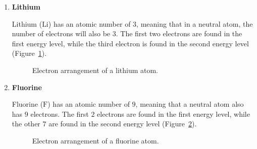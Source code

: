 \begin{enumerate}[noitemsep, label=\textbf{\arabic*}. ] 

\item{\textbf{Lithium} \\
\begin{minipage}{.4\textwidth}
Lithium ($\text{Li}$) has an atomic number of $3$, meaning that in a neutral atom, the number of electrons will also be $3$. The first two electrons are found in the first energy level, while the third electron is found in the second energy level (Figure~\ref{fig:atom:lithium}).
\end{minipage}
\begin{minipage}{.6\textwidth}
\begin{figure}[H]
\begin{center}
\caption{Electron arrangement of a lithium atom.}
\label{fig:atom:lithium}
\end{center}
\end{figure}
\end{minipage}
}

\item{\textbf{Fluorine} \\
\begin{minipage}{.4\textwidth}
Fluorine ($\text{F}$) has an atomic number of $9$, meaning that a neutral atom also has $9$ electrons. The first $2$ electrons are found in the first energy level, while the other $7$ are found in the second energy level (Figure~\ref{fig:atom:fluorine}).
\end{minipage}
\begin{minipage}{.6\textwidth}
\begin{figure}[H]
\begin{center}
\caption{Electron arrangement of a fluorine atom.}
\label{fig:atom:fluorine}
\end{center}
\end{figure}
\end{minipage}
}


\end{enumerate}
